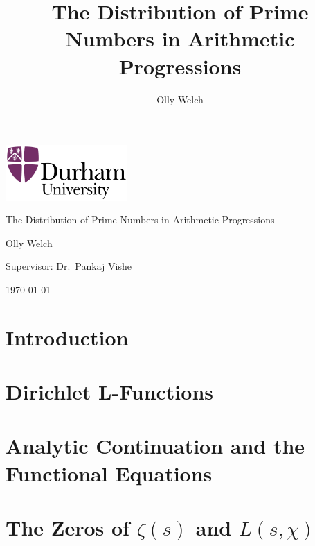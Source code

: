 \documentclass[11pt]{report} %
\title{The Distribution of Prime Numbers in Arithmetic Progressions}
\author{Olly Welch}
\numberwithin{equation}{chapter}
\theoremstyle{definition}
\theoremstyle{remark}
\begin{document}

\begin{titlepage}
	\centering
	\includegraphics[width=0.35\textwidth]{University_of_Durham_logo.png}\par\vspace{1cm}
	\vspace{1cm}
	{\LARGE The Distribution of Prime Numbers in Arithmetic Progressions\par}
	\vspace{1.5cm}
	{\Large Olly Welch\par}
		\vspace{0.5cm}
	{\large Supervisor:
	Dr.~Pankaj Vishe}

	\vfill

	{\large \today\par}
\end{titlepage}

\tableofcontents
{}



\chapter{Introduction}

\chapter{Dirichlet L-Functions}





\chapter{Analytic Continuation and the Functional Equations}



\chapter{The Zeros of $\zeta(s)$ and $L(s, \chi)$}






\end{document}
